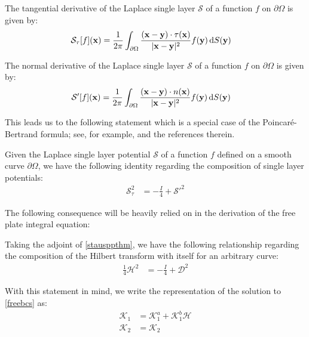\documentclass[preprint,12pt,3p]{elsarticle}
\newcommand{\dd}{ {\rm d} }
\begin{document}
\begin{definition}
The tangential derivative of the Laplace single layer $\mathcal{S}$ of a function $f$ on $\partial \Omega$ is given by:
\begin{align}
    \mathcal{S}_{\tau}[f](\mathbf{x}) &= \frac{1}{2\pi} \int_{\partial \Omega} \frac{(\mathbf{x}-\mathbf{y}) \cdot \tau(\mathbf{x})}{|\mathbf{x}-\mathbf{y}|^2} f(\mathbf{y}) \, \dd S(\mathbf{y})
\end{align}
\end{definition}

\begin{definition}
The normal derivative of the Laplace single layer  $\mathcal{S}$ of a function $f$ on $\partial \Omega$  is given by:
\begin{align}
    \mathcal{S}'[f](\mathbf{x}) &= \frac{1}{2 \pi} \int_{\partial \Omega} \frac{(\mathbf{x}-\mathbf{y}) \cdot  n(\mathbf{x}) }{|\mathbf{x}-\mathbf{y}|^2} f(\mathbf{y}) \, \dd S(\mathbf{y})
\end{align}
\end{definition}
This leads us to the following statement which is a special case of the Poincar\'e-Bertrand formula; see, for example, \cite{muskhelishvilisingularbook,shidong} and the references therein. 
\begin{rmk} Given the Laplace single layer potential $\mathcal{S}$ of a function $f$ defined on a smooth curve $\partial \Omega$, we have the following identity regarding the composition of single layer potentials:
\begin{align}
    \mathcal{S}_\tau^2 &= -\frac{I}{4} + \mathcal{S}'^2 \label{stausppthm}
\end{align}
\end{rmk}
\noindent The following consequence will be heavily relied on in the derivation of the free plate integral equation:
\begin{rmk} Taking the adjoint of \eqref{stausppthm}, we have the following relationship regarding the composition of the Hilbert transform with itself for an arbitrary curve:
\begin{align}
    \frac{1}{4}\mathcal{H}^2 &= - \frac{I}{4} +  \mathcal{D}^2 \label{hilbsquared}
\end{align}
\end{rmk}
With this statement in mind, we write the representation of the solution to \eqref{freebcs} as:
\begin{align}
    \mathcal{K}_1 &= \mathcal{K}_1^a + \mathcal{K}_1^b  \mathcal{H} \\
    \mathcal{K}_2 &= \mathcal{K}_2
\end{align}
\end{document}
